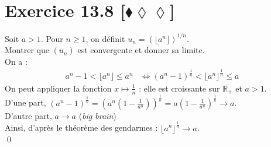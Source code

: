 \documentclass[10pt]{article}
\begin{document}
\section*{Exercice 13.8 [$\blacklozenge\lozenge\lozenge$]}
\begin{tcolorbox}[enhanced, width=7.6in, center, size=fbox, fontupper=\large, drop shadow southwest]
    Soit $a>1$. Pour $n\geq1$, on définit $u_n=(\lfloor a^n \rfloor)^{1/n}$.\\
    Montrer que $(u_n)$ est convergente et donner sa limite.\\
    On a :
    \begin{align*}
        a^n - 1 < \lfloor a^n \rfloor \leq a^n &\iff (a^n - 1)^{\frac{1}{n}} < \lfloor a^n \rfloor ^ \frac{1}{n} \leq a
    \end{align*}
    On peut appliquer la fonction $x\mapsto \frac{1}{n}$ : elle est croissante sur $\mathbb{R}_+$ et $a>1$.\\
    D'une part, $(a^n - 1)^{\frac{1}{n}} = (a^n(1 - \frac{1}{a^n}))^{\frac{1}{n}} = a(1-\frac{1}{a^n})^\frac{1}{n} \to a$.\\
    D'autre part, $a \to a$ (\emph{big brain})\\
    Ainsi, d'après le théorème des gendarmes : $\lfloor a^n \rfloor ^ \frac{1}{n} \to a$.\\
    \qed
\end{tcolorbox}


\end{document}

